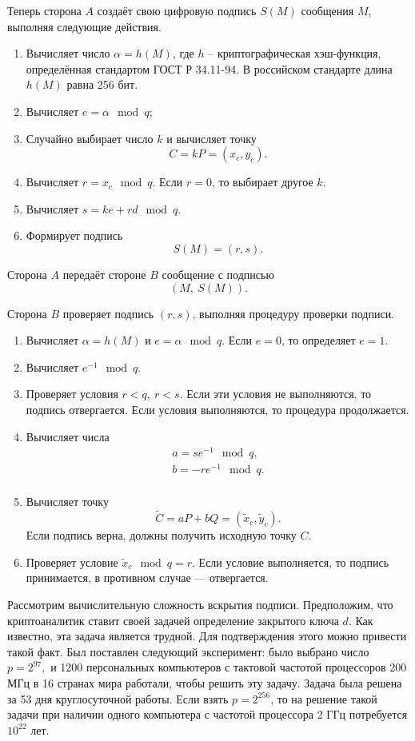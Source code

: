 Теперь сторона $A$ создаёт свою цифровую подпись $S(M)$ сообщения $M$, выполняя следующие действия.
\begin{enumerate}
    \item Вычисляет число $\alpha = h(M)$, где $h$ -- криптографическая хэш-функция, определённая стандартом ГОСТ Р 34.11-94. В российском стандарте длина $h(M)$ равна 256 бит.
    \item Вычисляет  $e = \alpha \mod q$;
    \item Случайно выбирает число $k$ и вычисляет точку
        \[ C = k P = (x_c, y_c). \]
    \item Вычисляет  $r = x_c \mod q$.
	Если $r = 0$, то выбирает другое $k$.
    \item Вычисляет  $s = k e + r d \mod q$.
    \item Формирует подпись
        \[ S(M) = (r, s). \]
\end{enumerate}
Сторона $A$ передаёт стороне $B$ сообщение с подписью
    \[ (M, ~ S(M)). \]

Сторона $B$ проверяет подпись $(r,s)$, выполняя процедуру проверки подписи.
\begin{enumerate}
    \item Вычисляет  $\alpha = h(M)$ и $e = \alpha \mod q$. Если $e = 0$, то определяет $e = 1$.
    \item Вычисляет  $e^{-1} \mod q$.
    \item Проверяет условия $r < q, ~ r < s$. Если эти условия не выполняются, то подпись отвергается. Если условия выполняются, то процедура продолжается.
    \item Вычисляет числа
        \[ \begin{array}{l}
            a = s e^{-1} \mod q, \\
            b = -r e^{-1} \mod q. \\
        \end{array} \]
    \item Вычисляет точку
        \[ \tilde{C} = a P + b Q = (\tilde{x}_c, \tilde{y}_c). \]
        Если подпись верна, должны получить исходную точку $C$.
    \item Проверяет условие $\tilde{x}_{c} \mod q = r$. Если условие выполняется, то подпись принимается, в противном случае --- отвергается.
\end{enumerate}

Рассмотрим вычислительную сложность вскрытия подписи. Предположим, что криптоаналитик ставит своей задачей определение закрытого ключа $d$. Как известно, эта задача является трудной. Для подтверждения этого можно привести такой факт. Был поставлен следующий эксперимент: было выбрано число $p = 2^{97},$ и 1200 персональных компьютеров с тактовой частотой процессоров 200 МГц в 16 странах мира работали, чтобы решить эту задачу. Задача была решена за 53 дня круглосуточной работы. Если взять $p = 2^{256}$, то на решение такой задачи при наличии одного компьютера с частотой процессора 2 ГГц потребуется $10^{22}$ лет.
